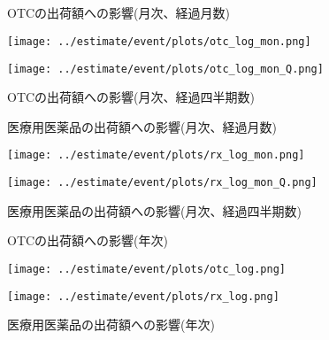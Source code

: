 \documentclass[a4paper,11pt,uplatex]{jsarticle}
\theoremstyle{definition}
\begin{document}

\newpage
\begin{appendices}
    \def\thesection{付録\Alph{section}}
    \section{}\label{event_graph}
    \begin{figure}[H]
        \centering
        \begin{minipage}{0.45\textwidth}
            \caption{OTCの出荷額への影響(月次、経過月数)}
            \centering
            \texttt{[image: ../estimate/event/plots/otc\_log\_mon.png]}
            \end{minipage}\hfill
        \begin{minipage}{0.45\textwidth}
            \caption{OTCの出荷額への影響(月次、経過四半期数)}
            \centering
            \texttt{[image: ../estimate/event/plots/otc\_log\_mon\_Q.png]}
        \end{minipage}
    \end{figure}
    \begin{figure}[H]
        \centering
        \begin{minipage}{0.45\textwidth}
            \caption{医療用医薬品の出荷額への影響(月次、経過月数)}
            \centering
            \texttt{[image: ../estimate/event/plots/rx\_log\_mon.png]}
            \end{minipage}\hfill
        \begin{minipage}{0.45\textwidth}
            \caption{医療用医薬品の出荷額への影響(月次、経過四半期数)}
            \centering
            \texttt{[image: ../estimate/event/plots/rx\_log\_mon\_Q.png]}
        \end{minipage}
    \end{figure}
    \begin{figure}[H]
        \centering
        \begin{minipage}{0.45\textwidth}
            \caption{OTCの出荷額への影響(年次)}
            \centering
            \texttt{[image: ../estimate/event/plots/otc\_log.png]}
        \end{minipage}\hfill
        \begin{minipage}{0.45\textwidth}
            \caption{医療用医薬品の出荷額への影響(年次)}
            \centering
            \texttt{[image: ../estimate/event/plots/rx\_log.png]}
        \end{minipage}
    \end{figure}
    \newpage

\end{appendices}
\end{document}
